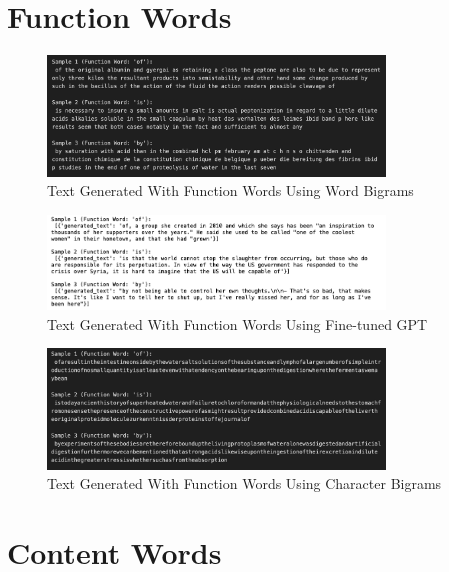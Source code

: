 \documentclass[journal,onecolumn]{IEEEtran}
\begin{document}
\section{Function Words}

\begin{figure}[H]
    \centering
    \includegraphics[width=0.8\textwidth]{WordBigrams/FunctionWords_Bigram.png} %
    \caption{Text Generated With Function Words Using Word Bigrams}
    \label{fig:example_result}
\end{figure}

\begin{figure}[H]
    \centering
    \includegraphics[width=0.8\textwidth]{GPT/FunctionWords_GPT.png} %
    \caption{Text Generated With Function Words Using Fine-tuned GPT}
    \label{fig:example_result}
\end{figure}

\begin{figure}[H]
    \centering
    \includegraphics[width=0.8\textwidth]{CharacterBigrams/FunctionWords_CharBigrams.png} %
    \caption{Text Generated With Function Words Using Character Bigrams}
    \label{fig:example_result}
\end{figure}

\section{Content Words}
\end{document}
